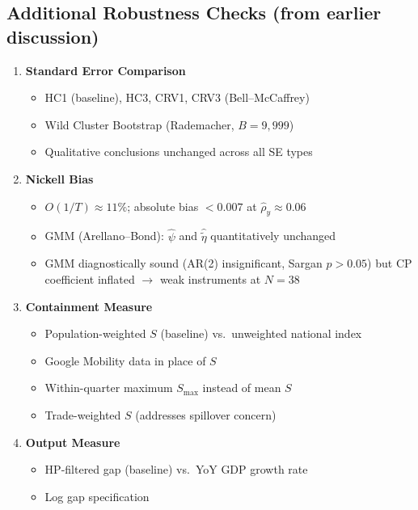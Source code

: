 \documentclass[12pt, a4paper]{article}
\begin{document}
\subsection*{Additional Robustness Checks (from earlier discussion)}

\begin{enumerate}[resume]

\item \textbf{Standard Error Comparison}
\begin{itemize}
    \item HC1 (baseline), HC3, CRV1, CRV3 (Bell--McCaffrey)
    \item Wild Cluster Bootstrap (Rademacher, $B = 9{,}999$)
    \item Qualitative conclusions unchanged across all SE types
\end{itemize}

\item \textbf{Nickell Bias}
\begin{itemize}
    \item $O(1/T) \approx 11\%$; absolute bias $< 0.007$ at
        $\hat{\rho}_y \approx 0.06$
    \item GMM (Arellano--Bond): $\hat{\psi}$ and $\hat{\tilde{\eta}}$
        quantitatively unchanged
    \item GMM diagnostically sound (AR(2) insignificant, Sargan $p > 0.05$)
        but CP coefficient inflated $\to$ weak instruments at $N = 38$
\end{itemize}

\item \textbf{Containment Measure}
\begin{itemize}
    \item Population-weighted $S$ (baseline) vs.\ unweighted national index
    \item Google Mobility data in place of $S$
    \item Within-quarter maximum $S_{\max}$ instead of mean $S$
    \item Trade-weighted $S$ (addresses spillover concern)
\end{itemize}

\item \textbf{Output Measure}
\begin{itemize}
    \item HP-filtered gap (baseline) vs.\ YoY GDP growth rate
    \item Log gap specification
\end{itemize}


\end{enumerate}
\end{document}
